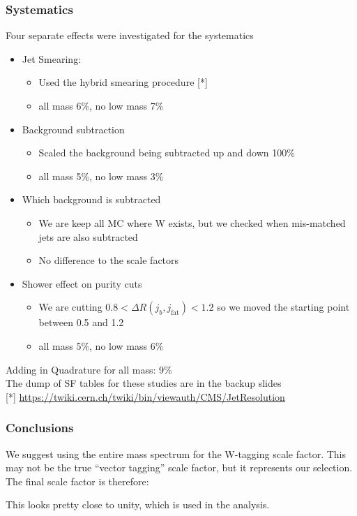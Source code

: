 \documentclass{beamer}
\begin{document}
\begin{frame}
  \frametitle{Systematics}
 Four separate effects were investigated for the systematics
  \begin{itemize}
  \item Jet Smearing: 
    \begin{itemize}
    \item Used the hybrid smearing procedure [*] \\
    \item all mass 6\%, no low mass 7\%
    \end{itemize}
  \item Background subtraction
    \begin{itemize}
    \item Scaled the background being subtracted up and down 100\%
    \item all mass 5\%, no low mass 3\%
    \end{itemize}
  \item Which background is subtracted
    \begin{itemize}
      \item We are keep all MC where W exists, but we checked when mis-matched jets
        are also subtracted
      \item No difference to the scale factors
    \end{itemize}
  \item Shower effect on purity cuts
    \begin{itemize}
      \item We are cutting $0.8 < \Delta R(j_b,j_\text{fat}) < 1.2$
        so we moved the starting point between 0.5 and 1.2
      \item all mass 5\%, no low mass 6\%
    \end{itemize}
  \end{itemize}
  Adding in Quadrature for all mass: 9\% \\
  The dump of SF tables for these studies are in the backup slides \\
  \vspace{12pt}
  {\small [*] 
    \href{https://twiki.cern.ch/twiki/bin/viewauth/CMS/JetResolution#Smearing_procedures}
         {https://twiki.cern.ch/twiki/bin/viewauth/CMS/JetResolution}}

\end{frame}

\begin{frame}
  \frametitle{Conclusions}
  We suggest using the entire mass spectrum for the W-tagging scale factor.
  This may not be the true ``vector tagging'' scale factor, but it represents our selection.
  The final scale factor is therefore: \\
  
  \begin{center}
  \end{center}

  This looks pretty close to unity, which is used in the analysis.
\end{frame}
\end{document}
